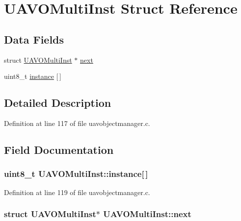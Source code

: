 \hypertarget{struct_u_a_v_o_multi_inst}{\section{\-U\-A\-V\-O\-Multi\-Inst \-Struct \-Reference}
\label{struct_u_a_v_o_multi_inst}
}
\subsection*{\-Data \-Fields}
\begin{DoxyCompactItemize}
\item 
struct \hyperlink{struct_u_a_v_o_multi_inst}{\-U\-A\-V\-O\-Multi\-Inst} $\ast$ \hyperlink{struct_u_a_v_o_multi_inst_a571693c984fd7e8e845fe57fca2d21d9}{next}
\item 
uint8\-\_\-t \hyperlink{struct_u_a_v_o_multi_inst_ab48732994d9762f9493940dc57e60f8b}{instance} \mbox{[}$\,$\mbox{]}
\end{DoxyCompactItemize}


\subsection{\-Detailed \-Description}


\-Definition at line 117 of file uavobjectmanager.\-c.



\subsection{\-Field \-Documentation}
\hypertarget{struct_u_a_v_o_multi_inst_ab48732994d9762f9493940dc57e60f8b}{
\subsubsection[{instance}]{\setlength{\rightskip}{0pt plus 5cm}uint8\-\_\-t {\bf \-U\-A\-V\-O\-Multi\-Inst\-::instance}\mbox{[}$\,$\mbox{]}}}\label{struct_u_a_v_o_multi_inst_ab48732994d9762f9493940dc57e60f8b}


\-Definition at line 119 of file uavobjectmanager.\-c.

\hypertarget{struct_u_a_v_o_multi_inst_a571693c984fd7e8e845fe57fca2d21d9}{
\subsubsection[{next}]{\setlength{\rightskip}{0pt plus 5cm}struct {\bf \-U\-A\-V\-O\-Multi\-Inst}$\ast$ {\bf \-U\-A\-V\-O\-Multi\-Inst\-::next}}}\label{struct_u_a_v_o_multi_inst_a571693c984fd7e8e845fe57fca2d21d9}


